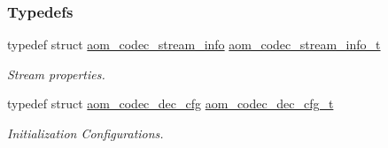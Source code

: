 \subsubsection*{Typedefs}
\begin{DoxyCompactItemize}
\item 
typedef struct \hyperlink{structaom__codec__stream__info}{aom\+\_\+codec\+\_\+stream\+\_\+info} \hyperlink{group__decoder_gab348c42a78bbbaa6488c84cdf3a28aaa}{aom\+\_\+codec\+\_\+stream\+\_\+info\+\_\+t}
\begin{DoxyCompactList}\small\item\em Stream properties. \end{DoxyCompactList}\item 
typedef struct \hyperlink{structaom__codec__dec__cfg}{aom\+\_\+codec\+\_\+dec\+\_\+cfg} \hyperlink{group__decoder_ga629c80380a9351796022345f655a5f3d}{aom\+\_\+codec\+\_\+dec\+\_\+cfg\+\_\+t}
\begin{DoxyCompactList}\small\item\em Initialization Configurations. \end{DoxyCompactList}\end{DoxyCompactItemize}
